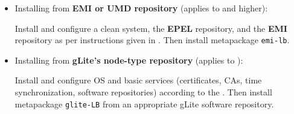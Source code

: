 \begin{itemize}
\item Installing from \textbf{EMI or UMD repository} (applies to  and higher):

Install and configure a clean system, the \textbf{EPEL} repository, and the \textbf{EMI} repository as per instructions given in . Then install metapackage \texttt{emi-lb}.

\item Installing from \textbf{gLite's node-type repository} (applies to ):

Install and configure OS and basic services (certificates, CAs, time synchronization, software repositories) according to the . Then install metapackage \texttt{glite-LB} from an appropriate gLite software repository.

%
%
%
%
%
%
%
%
%
%
%
%
%
%
\end{itemize}

